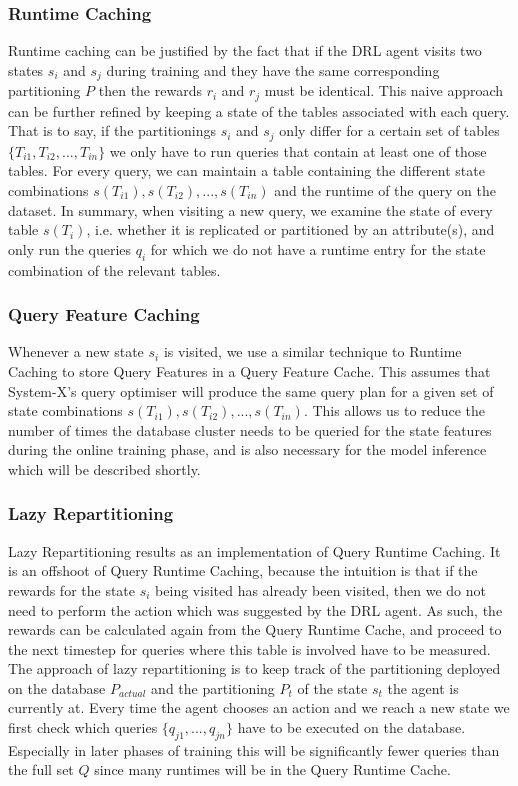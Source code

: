 \subsubsection{Runtime Caching}
Runtime caching can be justified by the fact that if the DRL agent visits two states $s_i$ and $s_j$ during training and they have the same corresponding partitioning $P$ then the rewards $r_i$ and $r_j$ must be identical. This naive approach can be further refined by keeping a state of the tables associated with each query. That is to say, if the partitionings $s_i$ and $s_j$ only differ for a certain set of tables $\{T_{i1}, T_{i2},...,T_{in}\}$ we only have to run queries that contain at least one of those tables. For every query, we can maintain a table containing the different state combinations $s(T_{i1}),s(T_{i2}),...,s(T_{in})$ and the runtime of the query on the dataset. In summary, when visiting a new query, we examine the state of every table $s(T_i)$, i.e. whether it is replicated or partitioned by an attribute(s), and only run the queries $q_i$ for which we do not have a runtime entry for the state combination of the relevant tables.
\subsubsection{Query Feature Caching}
Whenever a new state $s_i$ is visited, we use a similar technique to Runtime Caching to store Query Features in a Query Feature Cache. This assumes that System-X's query optimiser will produce the same query plan for a given set of state combinations $s(T_{i1}),s(T_{i2}),...,s(T_{in})$. This allows us to reduce the number of times the database cluster needs to be queried for the state features during the online training phase, and is also necessary for the model inference which will be described shortly.

\subsubsection{Lazy Repartitioning}
Lazy Repartitioning results as an implementation of Query Runtime Caching. It is an offshoot of Query Runtime Caching, because the intuition is that if the rewards for the state $s_i$ being visited has already been visited, then we do not need to perform the action which was suggested by the DRL agent. As such, the rewards can be calculated again from the Query Runtime Cache, and proceed to the next timestep for queries where this table is involved have to be measured. The approach of lazy repartitioning is to keep track of the partitioning deployed on the database $P_{actual}$ and the partitioning $P_t$ of the state $s_t$ the agent is currently at. Every time the agent chooses an action and we reach a new state we first check which queries $\{q_{j1}, . . . , q_{jn}\}$ have to be executed on the database. Especially in later phases of training this will be significantly fewer queries than the full set $Q$ since many runtimes will be in the Query Runtime Cache.

